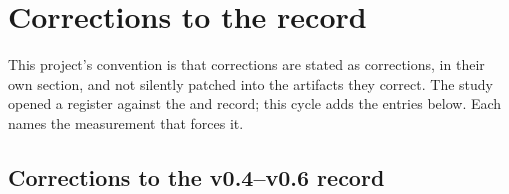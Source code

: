 \section{Corrections to the record}
\label{sec:corrections}

This project's convention is that corrections are stated as corrections, in their own section, and not
silently patched into the artifacts they correct. The \vsix{} study opened a register against the
\vfour{} and \vfive{} record; this cycle adds the entries below. Each names the measurement that forces
it.

\subsection{Corrections to the v0.4--v0.6 record}
\label{sec:corrections-corpus}

